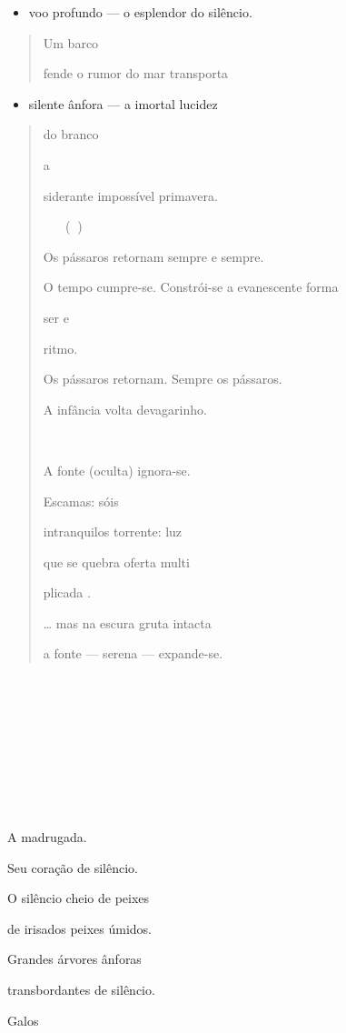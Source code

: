 \begin{itemize}
\item
  voo profundo --- o esplendor do silêncio.
\end{itemize}

\begin{quote}
Um barco

fende o rumor do mar transporta
\end{quote}

\begin{itemize}
\item
  silente ânfora --- a imortal lucidez
\end{itemize}

\begin{quote}
do branco

a

siderante impossível primavera.

 ()

Os pássaros retornam sempre e sempre.

O tempo cumpre-se. Constrói-se a evanescente forma

ser e

ritmo.

Os pássaros retornam. Sempre os pássaros.

A infância volta devagarinho.



A fonte (oculta) ignora-se.

Escamas: sóis

intranquilos torrente: luz

que se quebra oferta multi

plicada .

\ldots{} mas na escura gruta intacta

a fonte --- serena --- expande-se.
\end{quote}











A madrugada.

Seu coração de silêncio.

O silêncio cheio de peixes

de irisados peixes úmidos.

Grandes árvores ânforas

transbordantes de silêncio.

Galos

